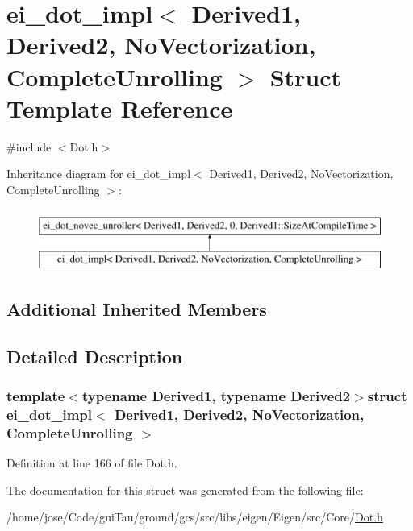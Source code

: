 \hypertarget{structei__dot__impl_3_01_derived1_00_01_derived2_00_01_no_vectorization_00_01_complete_unrolling_01_4}{\section{ei\-\_\-dot\-\_\-impl$<$ Derived1, Derived2, No\-Vectorization, Complete\-Unrolling $>$ Struct Template Reference}
\label{structei__dot__impl_3_01_derived1_00_01_derived2_00_01_no_vectorization_00_01_complete_unrolling_01_4}
}


{\ttfamily \#include $<$Dot.\-h$>$}

Inheritance diagram for ei\-\_\-dot\-\_\-impl$<$ Derived1, Derived2, No\-Vectorization, Complete\-Unrolling $>$\-:\begin{figure}[H]
\begin{center}
\leavevmode
\includegraphics[height=2.000000cm]{structei__dot__impl_3_01_derived1_00_01_derived2_00_01_no_vectorization_00_01_complete_unrolling_01_4}
\end{center}
\end{figure}
\subsection*{Additional Inherited Members}


\subsection{Detailed Description}
\subsubsection*{template$<$typename Derived1, typename Derived2$>$struct ei\-\_\-dot\-\_\-impl$<$ Derived1, Derived2, No\-Vectorization, Complete\-Unrolling $>$}



Definition at line 166 of file Dot.\-h.



The documentation for this struct was generated from the following file\-:\begin{DoxyCompactItemize}
\item 
/home/jose/\-Code/gui\-Tau/ground/gcs/src/libs/eigen/\-Eigen/src/\-Core/\hyperlink{_dot_8h}{Dot.\-h}\end{DoxyCompactItemize}

